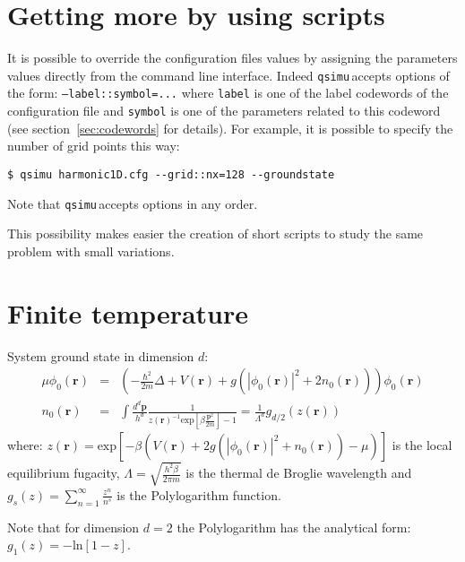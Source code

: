 \documentclass[12pt,a4paper]{report}
\newcommand{\abs}[1]{\left|#1\right|}
\newcommand{\qsimu}{\texttt{qsimu}\,}
\renewcommand{\exp}[1]{\textrm{exp}\left[#1\right]}
\renewcommand{\ln}[1]{\textrm{ln}\left[#1\right]}
\begin{document}
\appendix
\chapter{Getting more by using scripts}
It is possible to override the configuration files values by assigning the parameters values directly from the command line interface.
Indeed \qsimu accepts options of the form: \texttt{--label::symbol=...} where \texttt{label} is one of the label codewords of the configuration file and \texttt{symbol} is one of the parameters related to this codeword (see section~\ref{sec:codewords} for details).
For example, it is possible to specify the number of grid points this way:
\begin{verbatim}
$ qsimu harmonic1D.cfg --grid::nx=128 --groundstate
\end{verbatim}
Note that \qsimu accepts options in any order.

This possibility makes easier the creation of short scripts to study the same problem with small variations.

\chapter{Finite temperature}
System ground state in dimension $d$:
\begin{subequations}
\begin{eqnarray}
\mu \phi_0(\bm{r})&=&\left(-\frac{\hbar^2}{2m}\Delta+V(\bm{r})+g\left(\abs{\phi_0(\bm{r})}^2+2n_0(\bm{r})\right)\right)\phi_0(\bm{r})\\
n_0(\bm{r})&=&\int\frac{d^d\bm{p}}{h^d}
\frac{1}{z(\bm{r})^{-1}\exp{\beta\frac{\bm{p}^2}{2m}}-1}
=\frac{1}{\Lambda^d}g_{d/2}\left(z(\bm{r})\right)
\end{eqnarray}
\end{subequations}
where: $z(\bm{r})=\exp{-\beta\left(V(\bm{r})+2g\left(\abs{\phi_0(\bm{r})}^2+n_0(\bm{r})\right)-\mu\right)}$ is the local equilibrium fugacity, $\Lambda=\sqrt{\frac{h^2\beta}{2\pi m}}$ is the thermal de Broglie wavelength and $g_s(z)=\sum_{n=1}^\infty\frac{z^n}{n^s}$ is the Polylogarithm function.

Note that for dimension $d=2$ the Polylogarithm has the analytical form: $g_1(z)=-\ln{1-z}$.
\end{document}
